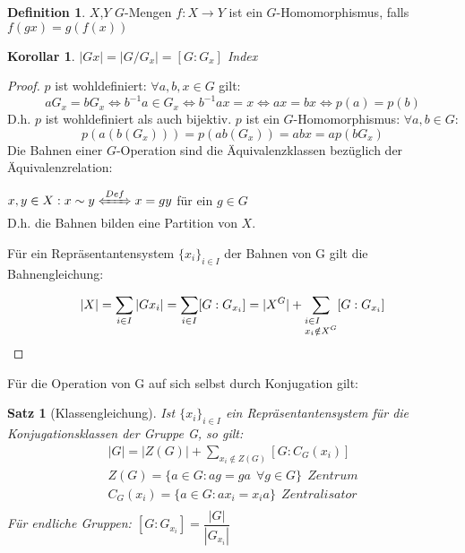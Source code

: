 \documentclass[12pt]{scrartcl}%
\newtheorem{thm}{Satz}
\newtheorem{kor}{Korollar}
\theoremstyle{definition}
\newtheorem*{defn}{Definition}
\theoremstyle{remark}
\begin{document}
	\begin{defn}
	$X$,$Y$ $G$-Mengen $f: X \rightarrow Y$ ist ein $G$-Homomorphismus, falls $f(gx)=g(f(x))$
	\end{defn}
	
	\begin{kor}
	$|Gx|=|G/G_x|=[G:G_x]$ Index
	\end{kor}
	
	\begin{proof}
	$p$ ist wohldefiniert: $\forall a,b,x \in G$ gilt:
	$$aG_x=bG_x \Leftrightarrow b^{-1}a \in G_x \Leftrightarrow b^{-1}ax=x \Leftrightarrow ax=bx \Leftrightarrow p(a)=p(b)$$
	D.h. $p$ ist wohldefiniert als auch bijektiv.
	$p$ ist ein $G$-Homomorphismus: $\forall a,b \in G$:
	$$p(a(b(G_x)))=p(ab(G_x))=abx=ap(bG_x)$$
	Die Bahnen einer $G$-Operation sind die Äquivalenzklassen bezüglich der Äquivalenzrelation:
	
	$x,y \in X : x \sim y \xLeftrightarrow{Def} x=gy$ für ein $g\in G$\\
	D.h. die Bahnen bilden eine Partition von $X$.
	
	Für ein Repräsentantensystem $\{ x_i\}_{i\in I}$ der Bahnen von G gilt die Bahnengleichung:

	$$|X|=\sum\limits_{\begin{subarray}{1}i \in I\end{subarray}}|Gx_i|=\sum\limits_{\begin{subarray}{1}i \in I\end{subarray}}[G:G_{x_i}]=|X^G|+\sum\limits_{\begin{subarray}{1}i \in I\\ x_i \notin X^G\end{subarray}}[G:G_{x_i}]$$
	
	\end{proof}

Für die Operation von G auf sich selbst durch Konjugation gilt:
\begin{thm} [Klassengleichung]
Ist $\{x_{i}\}_{i \in I}$ ein Repräsentantensystem für die Konjugationsklassen der Gruppe G, so gilt: 
\begin{gather*}
|G|= |Z(G)|+\sum_{x_{i}\notin Z(G)}[G:C_{G}(x_{i})] \\ 
Z(G)=\{a \in G :ag=ga\ \ \forall g \in G\}\ \ Zentrum \\
C_{G}(x_{i})= \{a \in G :ax_{i}=x_{i}a\}\ \ Zentralisator \\
\end{gather*}
Für endliche Gruppen: $[G:G_{x_{i}}]=\dfrac{|G|}{|G_{x_{i}}|}$
\end{thm}
\end{document}
